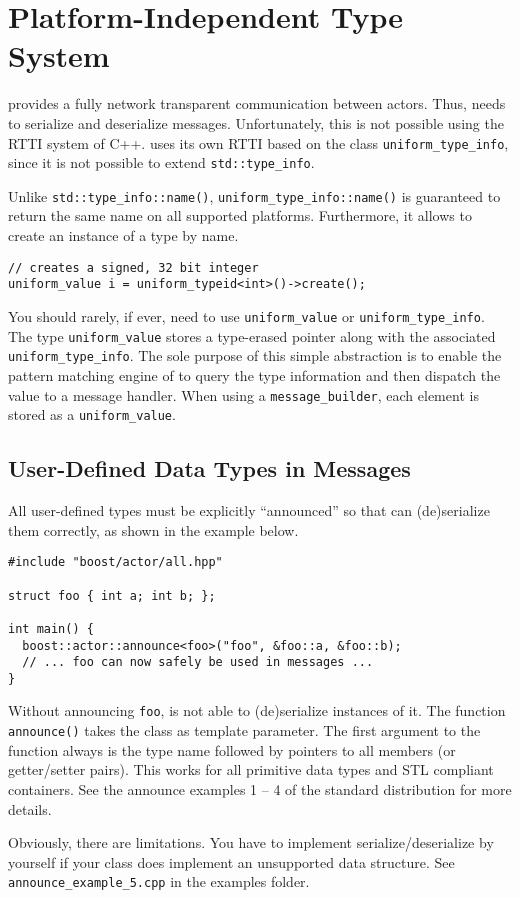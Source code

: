 \section{Platform-Independent Type System}
\label{Sec::TypeSystem}

\lib provides a fully network transparent communication between actors.
Thus, \lib needs to serialize and deserialize messages.
Unfortunately, this is not possible using the RTTI system of C++.
\lib uses its own RTTI based on the class \lstinline^uniform_type_info^, since it is not possible to extend \lstinline^std::type_info^.

Unlike \lstinline^std::type_info::name()^, \lstinline^uniform_type_info::name()^ is guaranteed to return the same name on all supported platforms. Furthermore, it allows to create an instance of a type by name.

\begin{lstlisting}
// creates a signed, 32 bit integer
uniform_value i = uniform_typeid<int>()->create();
\end{lstlisting}

You should rarely, if ever, need to use \lstinline^uniform_value^ or \lstinline^uniform_type_info^.
The type \lstinline^uniform_value^ stores a type-erased pointer along with the associated \lstinline^uniform_type_info^.
The sole purpose of this simple abstraction is to enable the pattern matching engine of \lib to query the type information and then dispatch the value to a message handler.
When using a \lstinline^message_builder^, each element is stored as a \lstinline^uniform_value^.

\subsection{User-Defined Data Types in Messages}
\label{Sec::TypeSystem::UserDefined}

All user-defined types must be explicitly ``announced'' so that \lib can (de)serialize them correctly, as shown in the example below.

\begin{lstlisting}
#include "boost/actor/all.hpp"

struct foo { int a; int b; };

int main() {
  boost::actor::announce<foo>("foo", &foo::a, &foo::b);
  // ... foo can now safely be used in messages ...
}
\end{lstlisting}

Without announcing \lstinline^foo^, \lib is not able to (de)serialize instances of it.
The function \lstinline^announce()^ takes the class as template parameter.
The first argument to the function always is the type name followed by pointers to all members (or getter/setter pairs).
This works for all primitive data types and STL compliant containers.
See the announce examples 1 -- 4 of the standard distribution for more details.

Obviously, there are limitations.
You have to implement serialize/deserialize by yourself if your class does implement an unsupported data structure.
See \lstinline^announce_example_5.cpp^ in the examples folder.
